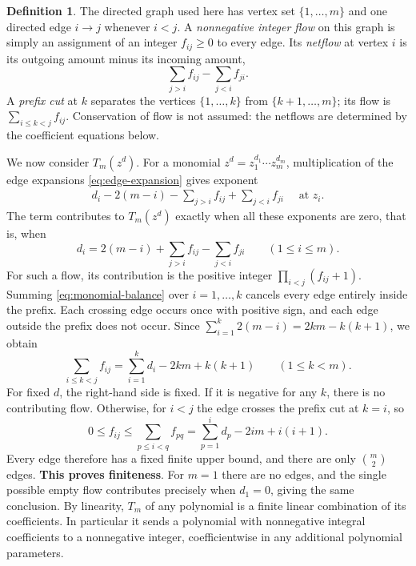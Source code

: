 \documentclass[reqno, 12pt]{article}
\numberwithin{equation}{section}
\theoremstyle{definition}
\newtheorem{definition}[theorem]{Definition}
\begin{document}
\begin{definition}\label{def:flows}
The directed graph used here has vertex set
$\{1,\ldots,m\}$ and one directed edge $i\to j$ whenever
$i<j$.  A \emph{nonnegative integer flow} on this graph is
simply an assignment of an integer $f_{ij}\geq0$ to every
edge.  Its \emph{netflow} at vertex $i$ is its outgoing amount
minus its incoming amount,
\[
\sum_{j>i}f_{ij}-\sum_{j<i}f_{ji}.
\]
A \emph{prefix cut} at $k$ separates the vertices
$\{1,\ldots,k\}$ from $\{k+1,\ldots,m\}$; its flow is
$\sum_{i\leq k<j}f_{ij}$.
Conservation of flow is not assumed: the netflows are determined by the coefficient equations below.
\end{definition}

We now consider $T_m(z^d)$.
For a monomial $z^d=z_1^{d_1}\cdots z_m^{d_m}$, multiplication
of the edge expansions \eqref{eq:edge-expansion} gives exponent
\begin{align*}
d_i-2(m-i)-\sum_{j>i}f_{ij}+\sum_{j<i}f_{ji}\quad \text{ at } z_i.
\end{align*}
The term contributes to $T_m(z^d)$ exactly when all
these exponents are zero, that is, when
\begin{equation}\label{eq:monomial-balance}
d_i=2(m-i)+\sum_{j>i}f_{ij}-\sum_{j<i}f_{ji}\qquad(1\leq i\leq m).
\end{equation}
For such a flow, its contribution is the positive integer
$\prod_{i<j}(f_{ij}+1)$.  Summing
\eqref{eq:monomial-balance} over $i=1,\ldots,k$ cancels every
edge entirely inside the prefix.  Each crossing edge occurs once
with positive sign, and each edge outside the prefix does not
occur.  Since
$\sum_{i=1}^k2(m-i)=2km-k(k+1)$, we obtain
\begin{equation}\label{eq:general-cut}
\sum_{i\leq k<j}f_{ij}
 =\sum_{i=1}^k d_i-2km+k(k+1)\qquad(1\leq k<m).
\end{equation}
For fixed $d$, the right-hand side is fixed.  If it is negative
for any $k$, there is no contributing flow.  Otherwise, for
$i<j$ the edge crosses the prefix cut at $k=i$, so
\[
0\leq f_{ij}\leq\sum_{p\leq i<q}f_{pq}
             =\sum_{p=1}^i d_p-2im+i(i+1).
\]
Every edge therefore has a fixed finite upper bound, and there
are only $\binom m2$ edges.  \textbf{This proves finiteness}.  For $m=1$
there are no edges, and the single possible empty flow contributes
precisely when $d_1=0$, giving the same conclusion.  By linearity,
$T_m$ of any polynomial is a finite linear combination of its
coefficients.  In particular it sends a polynomial with nonnegative
integral coefficients to a nonnegative integer, coefficientwise
in any additional polynomial parameters.
\end{document}
